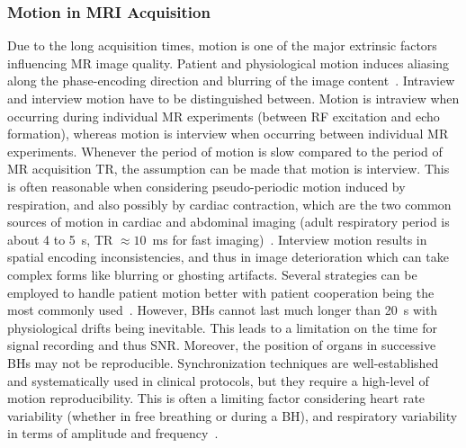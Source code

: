 \subsubsection{Motion in MRI Acquisition} \label{SubSubSec:IntraviewandInterviewMotion}
Due to the long acquisition times, motion is one of the major extrinsic factors influencing MR image quality. Patient and physiological motion induces aliasing along the phase-encoding direction and blurring of the image content~\cite{Kuestner2022}.
Intraview and interview motion have to be distinguished between. Motion is intraview when occurring during individual MR experiments (between RF excitation and echo formation), whereas motion is interview when occurring between individual MR experiments. Whenever the period of motion is slow compared to the period of MR acquisition 
TR, the assumption can be made that motion is interview. This is often reasonable when considering pseudo-periodic motion induced by respiration, and also possibly by cardiac contraction, which are the two common sources of motion in cardiac and abdominal imaging (adult respiratory period is about 4 to 5~s, TR $\approx 10$~ms for fast imaging)~\cite{GRICS}. Interview motion results in spatial encoding inconsistencies, and thus in image deterioration which can take complex forms like blurring or ghosting artifacts. Several strategies can be employed to handle patient motion better with patient cooperation being the most commonly used~\cite{GRICS}. However, BHs cannot last much longer than 20~s with physiological drifts being inevitable. This leads to a limitation on the time for signal recording and thus SNR. Moreover, the position of organs in successive BHs may not be reproducible. Synchronization techniques are well-established and systematically used in clinical protocols, but they require a high-level of motion reproducibility. This is often a limiting factor considering heart rate variability (whether in free breathing or during a BH), and respiratory variability in terms of amplitude and frequency~\cite{GRICS}. 


